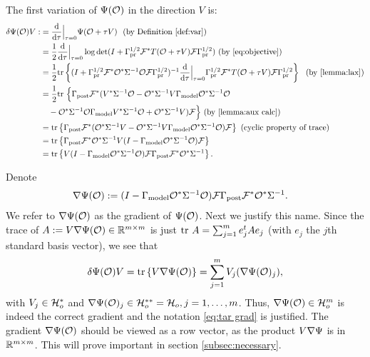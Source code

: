 The first variation of $\Psi (\mathcal{O})$ in the direction $V$ is:
\begin{align}\label{eq:tar var}
  \begin{split}
    \delta \tar(\obs) V 
    :&= \frac{\der}{\der\tau} \Big |_{\tau=0} \tar(\obs + \tau V)\  \text{ (by Definition \ref{def:var})}\\
    &= \frac12 \frac{\der}{\der \tau} \Big |_{\tau=0} \log \det 
    (I + \prcov^{1/2} \fwd^* T(\obs+\tau V)\fwd \prcov^{1/2} ) \text{ (by \eqref{eq:objective})}\\
    &= \frac12 \tr{( I + \prcov^{1/2} \fwd^* \obs^* \Sigma^{-1}
    \obs\fwd \prcov^{1/2} )^{-1}
    \frac{\der}{\der \tau} \Big |_{\tau=0}
    \prcov^{1/2} \fwd^* T(\obs+\tau V) \fwd \prcov^{1/2}}\ \text{ (by \ref{lemma:lax})}\\
    &= \frac12 \ttr\Big \{ \postcov \fwd^* (V^* \Sigma^{-1} \obs 
    - \obs^*\Sigma^{-1} V\modcov \obs^* \Sigma^{-1}\obs \\
    &\ \ \ - \obs^* \Sigma^{-1} \obs \modcov V^* \Sigma^{-1}\obs 
    + \obs^* \Sigma^{-1} V ) \fwd \Big \}  \text{ (by \ref{lemma:aux calc})}\\
    &= \tr{\postcov \fwd^* ( \obs^* \Sigma^{-1} V -
    \obs^*\Sigma^{-1} V\modcov \obs^* \Sigma^{-1}\obs ) \fwd} \text{
        (cyclic property of trace)} \\
    &= \tr{\postcov \fwd^* \obs^* \Sigma^{-1} V 
    ( I - \modcov \obs^* \Sigma^{-1}\obs ) \fwd} \\
    &= \tr{V ( I - \modcov \obs^* \Sigma^{-1}\obs )
    \fwd \postcov \fwd^* \obs^* \Sigma^{-1}}.
  \end{split}
\end{align} 

Denote
\begin{align}\label{eq:tar grad}
  \nabla \tar(\obs) &:= (I - \modcov \obs^* \Sigma^{-1} \obs) \fwd
  \postcov \fwd^* \obs^*\Sigma^{-1}.
\end{align}
We refer to $\nabla \Psi(\mathcal{O})$ as the gradient of $\Psi (\mathcal{O}
)$. Next we justify this name. Since the trace of $A := V \nabla
\Psi(\mathcal{O}) \in \mathbb{R}^{m \times m}$ is just $\textup{tr}\ A = \sum_{j=1}^m e_j^t A
e_j$ (with $e_j$ the $j$th standard basis vector), we see that
\begin{align*}
  \delta \tar(\obs)V = \tr{V \nabla \tar(\obs)} = \sum_{j=1}^m
  V_j(\nabla \tar(\obs)_j),
\end{align*}
with $V_j \in \mathcal{H}_o^*$ and $\nabla \Psi(\mathcal{O})_j \in \mathcal{H}_o^{**} =
\mathcal{H}_o, j=1,\dots,m$. Thus, $\nabla \Psi( \mathcal{O} ) \in \mathcal{H}_o^m$ is indeed
the correct gradient and the notation \eqref{eq:tar grad} is
justified. The gradient $\nabla \Psi(\mathcal{O})$ should be viewed as a row
vector, as the product $V \nabla \Psi$ is in $\mathbb{R}^{m \times m}$. This
will prove important in section \ref{subsec:necessary}.

